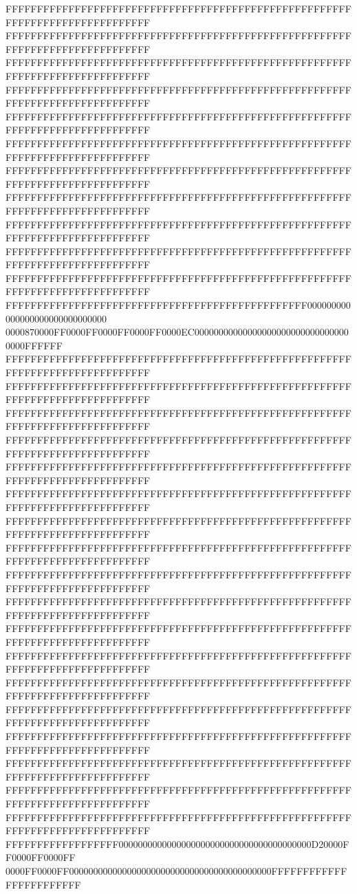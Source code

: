 FFFFFFFFFFFFFFFFFFFFFFFFFFFFFFFFFFFFFFFFFFFFFFFFFFFFFFFFFFFFFFFFFFFFFFFFFFFFFF
FFFFFFFFFFFFFFFFFFFFFFFFFFFFFFFFFFFFFFFFFFFFFFFFFFFFFFFFFFFFFFFFFFFFFFFFFFFFFF
FFFFFFFFFFFFFFFFFFFFFFFFFFFFFFFFFFFFFFFFFFFFFFFFFFFFFFFFFFFFFFFFFFFFFFFFFFFFFF
FFFFFFFFFFFFFFFFFFFFFFFFFFFFFFFFFFFFFFFFFFFFFFFFFFFFFFFFFFFFFFFFFFFFFFFFFFFFFF
FFFFFFFFFFFFFFFFFFFFFFFFFFFFFFFFFFFFFFFFFFFFFFFFFFFFFFFFFFFFFFFFFFFFFFFFFFFFFF
FFFFFFFFFFFFFFFFFFFFFFFFFFFFFFFFFFFFFFFFFFFFFFFFFFFFFFFFFFFFFFFFFFFFFFFFFFFFFF
FFFFFFFFFFFFFFFFFFFFFFFFFFFFFFFFFFFFFFFFFFFFFFFFFFFFFFFFFFFFFFFFFFFFFFFFFFFFFF
FFFFFFFFFFFFFFFFFFFFFFFFFFFFFFFFFFFFFFFFFFFFFFFFFFFFFFFFFFFFFFFFFFFFFFFFFFFFFF
FFFFFFFFFFFFFFFFFFFFFFFFFFFFFFFFFFFFFFFFFFFFFFFFFFFFFFFFFFFFFFFFFFFFFFFFFFFFFF
FFFFFFFFFFFFFFFFFFFFFFFFFFFFFFFFFFFFFFFFFFFFFFFFFFFFFFFFFFFFFFFFFFFFFFFFFFFFFF
FFFFFFFFFFFFFFFFFFFFFFFFFFFFFFFFFFFFFFFFFFFFFFFFFFFFFFFFFFFFFFFFFFFFFFFFFFFFFF
FFFFFFFFFFFFFFFFFFFFFFFFFFFFFFFFFFFFFFFFFFFFFFFF000000000000000000000000000000
0000870000FF0000FF0000FF0000FF0000EC000000000000000000000000000000000000FFFFFF
FFFFFFFFFFFFFFFFFFFFFFFFFFFFFFFFFFFFFFFFFFFFFFFFFFFFFFFFFFFFFFFFFFFFFFFFFFFFFF
FFFFFFFFFFFFFFFFFFFFFFFFFFFFFFFFFFFFFFFFFFFFFFFFFFFFFFFFFFFFFFFFFFFFFFFFFFFFFF
FFFFFFFFFFFFFFFFFFFFFFFFFFFFFFFFFFFFFFFFFFFFFFFFFFFFFFFFFFFFFFFFFFFFFFFFFFFFFF
FFFFFFFFFFFFFFFFFFFFFFFFFFFFFFFFFFFFFFFFFFFFFFFFFFFFFFFFFFFFFFFFFFFFFFFFFFFFFF
FFFFFFFFFFFFFFFFFFFFFFFFFFFFFFFFFFFFFFFFFFFFFFFFFFFFFFFFFFFFFFFFFFFFFFFFFFFFFF
FFFFFFFFFFFFFFFFFFFFFFFFFFFFFFFFFFFFFFFFFFFFFFFFFFFFFFFFFFFFFFFFFFFFFFFFFFFFFF
FFFFFFFFFFFFFFFFFFFFFFFFFFFFFFFFFFFFFFFFFFFFFFFFFFFFFFFFFFFFFFFFFFFFFFFFFFFFFF
FFFFFFFFFFFFFFFFFFFFFFFFFFFFFFFFFFFFFFFFFFFFFFFFFFFFFFFFFFFFFFFFFFFFFFFFFFFFFF
FFFFFFFFFFFFFFFFFFFFFFFFFFFFFFFFFFFFFFFFFFFFFFFFFFFFFFFFFFFFFFFFFFFFFFFFFFFFFF
FFFFFFFFFFFFFFFFFFFFFFFFFFFFFFFFFFFFFFFFFFFFFFFFFFFFFFFFFFFFFFFFFFFFFFFFFFFFFF
FFFFFFFFFFFFFFFFFFFFFFFFFFFFFFFFFFFFFFFFFFFFFFFFFFFFFFFFFFFFFFFFFFFFFFFFFFFFFF
FFFFFFFFFFFFFFFFFFFFFFFFFFFFFFFFFFFFFFFFFFFFFFFFFFFFFFFFFFFFFFFFFFFFFFFFFFFFFF
FFFFFFFFFFFFFFFFFFFFFFFFFFFFFFFFFFFFFFFFFFFFFFFFFFFFFFFFFFFFFFFFFFFFFFFFFFFFFF
FFFFFFFFFFFFFFFFFFFFFFFFFFFFFFFFFFFFFFFFFFFFFFFFFFFFFFFFFFFFFFFFFFFFFFFFFFFFFF
FFFFFFFFFFFFFFFFFFFFFFFFFFFFFFFFFFFFFFFFFFFFFFFFFFFFFFFFFFFFFFFFFFFFFFFFFFFFFF
FFFFFFFFFFFFFFFFFFFFFFFFFFFFFFFFFFFFFFFFFFFFFFFFFFFFFFFFFFFFFFFFFFFFFFFFFFFFFF
FFFFFFFFFFFFFFFFFFFFFFFFFFFFFFFFFFFFFFFFFFFFFFFFFFFFFFFFFFFFFFFFFFFFFFFFFFFFFF
FFFFFFFFFFFFFFFFFFFFFFFFFFFFFFFFFFFFFFFFFFFFFFFFFFFFFFFFFFFFFFFFFFFFFFFFFFFFFF
FFFFFFFFFFFFFFFFFF0000000000000000000000000000000000000000D20000FF0000FF0000FF
0000FF0000FF000000000000000000000000000000000000000000FFFFFFFFFFFFFFFFFFFFFFFF
